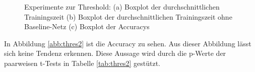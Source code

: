  \begin{figure}
     \centering
     \hfill
     \caption{Experimente zur Threshold: (a) Boxplot der durchschnittlichen Trainingszeit (b) Boxplot der durchschnittlichen Trainingszeit ohne Baseline-Netz (c) Boxplot der Accuracys}
     \label{abb:lr}
\end{figure}
In Abbildung \ref{abb:thres2} ist die Accuracy zu sehen. Aus dieser Abbildung lässt sich keine Tendenz erkennen. Diese Aussage wird durch die p-Werte der paarweisen t-Tests in Tabelle \ref{tab:thres2} gestützt.
